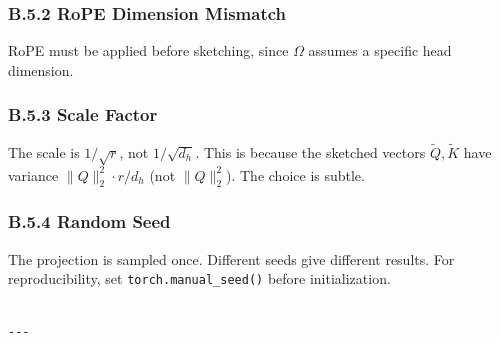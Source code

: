 \subsubsection{B.5.2 RoPE Dimension Mismatch}

RoPE must be applied before sketching, since $\Omega$ assumes a specific 
head dimension.

\subsubsection{B.5.3 Scale Factor}

The scale is $1/\sqrt{r}$, not $1/\sqrt{d_h}$. This is because the sketched 
vectors $\tilde{Q}, \tilde{K}$ have variance $\|Q\|_2^2 \cdot r / d_h$ (not 
$\|Q\|_2^2$). The choice is subtle.

\subsubsection{B.5.4 Random Seed}

The projection is sampled once. Different seeds give different results. 
For reproducibility, set \texttt{torch.manual\_seed()} before initialization.
\begin{lstlisting}

---
\end{lstlisting}